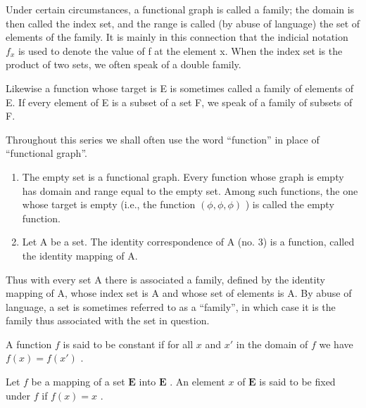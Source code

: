 Under certain circumstances, a functional graph is called a family; the domain is then called the index set, and the range is called (by abuse of language) the set of elements of the family. It is mainly in this connection that the indicial notation \(f_{x}\) is used to denote the value of f at the element x. When the index set is the product of two sets, we often speak of a double family.

Likewise a function whose target is E is sometimes called a family of elements of E. If every element of E is a subset of a set F, we speak of a family of subsets of F.

Throughout this series we shall often use the word ``function'' in place of ``functional graph''.


\begin{enumerate}
\def\labelenumi{(\arabic{enumi})}
\item
  The empty set is a functional graph. Every function whose graph is empty has domain and range equal to the empty set. Among such functions, the one whose target is empty (i.e., the function \((\phi, \phi, \phi)\) ) is called the empty function.
\item
  Let A be a set. The identity correspondence of A (no. 3) is a function, called the identity mapping of A.
\end{enumerate}

Thus with every set A there is associated a family, defined by the identity mapping of A, whose index set is A and whose set of elements is A. By abuse of language, a set is sometimes referred to as a ``family'', in which case it is the family thus associated with the set in question.

A function \(f\) is said to be constant if for all \(x\) and \(x'\) in the domain of \(f\) we have \(f(x) = f(x')\) .

Let \(f\) be a mapping of a set \(\mathbf{E}\) into \(\mathbf{E}\) . An element \(x\) of \(\mathbf{E}\) is said to be fixed under \(f\) if \(f(x) = x\) .

